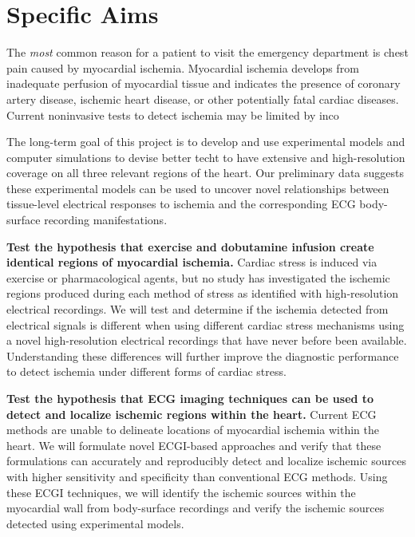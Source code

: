 %


%

\section{Specific Aims}

The \textit{most} common reason for a patient to visit the emergency
department is chest pain caused by myocardial ischemia. Myocardial ischemia
develops from inadequate perfusion of myocardial tissue and indicates the
presence of coronary artery disease, ischemic heart disease, or other
potentially fatal cardiac diseases. Current noninvasive tests to detect
ischemia may be limited by inco

The long-term goal of this project is to develop and use experimental
models and computer simulations to devise better techt to have extensive and high-resolution coverage on all three relevant regions of the heart. Our preliminary data suggests these experimental models can
      be used to uncover novel relationships between tissue-level
      electrical responses to ischemia and the corresponding ECG
      body-surface recording manifestations.
	
    \item [Aim 2:] \textbf{Test the hypothesis that exercise and dobutamine
        infusion create identical regions of myocardial ischemia.} Cardiac
      stress is induced via exercise or pharmacological agents, but no
      study has investigated the ischemic regions produced during each
      method of stress as identified with high-resolution electrical recordings. We will test and determine if the ischemia detected
      from electrical signals is different when using different cardiac
      stress mechanisms using a novel high-resolution electrical recordings
      that have never before been available. Understanding these
      differences will further improve the diagnostic performance to detect
      ischemia under different forms of cardiac stress.
	
    \item [Aim 3:] \textbf{Test the hypothesis that ECG imaging techniques
        can be used to detect and localize ischemic regions within the heart.} Current ECG methods are unable to delineate locations of
      myocardial ischemia within the heart. We will formulate novel
      ECGI-based approaches and verify that these formulations can
      accurately and reproducibly detect and localize ischemic sources with
      higher sensitivity and specificity than conventional ECG
      methods. Using these ECGI techniques, we will identify the ischemic
      sources within the myocardial wall from body-surface recordings and
      verify the ischemic sources detected using experimental models.
	
